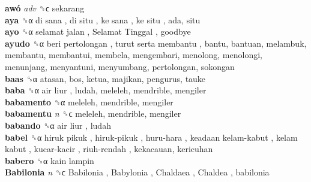 \textbf{awó} \emph{adv}  ␝ϲ  sekarang  \\
\textbf{aya} ␝α   di sana ,  di situ ,  ke sana ,  ke situ , ada, situ  \\
\textbf{ayo} ␝α   selamat jalan ,  Selamat Tinggal , goodbye  \\
\textbf{ayudo} ␝α   beri pertolongan ,  turut serta membantu , bantu, bantuan, melambuk, membantu, membantui, membela, mengembari, menolong, menolongi, menunjang, menyantuni, menyumbang, pertolongan, sokongan  \\
\textbf{baas} ␝α  atasan, bos, ketua, majikan, pengurus, tauke  \\
\textbf{baba} ␝α   air liur , ludah, meleleh, mendrible, mengiler  \\
\textbf{babamento} ␝α  meleleh, mendrible, mengiler  \\
\textbf{babamentu} \emph{n}  ␝ϲ  meleleh, mendrible, mengiler  \\
\textbf{babando} ␝α   air liur , ludah  \\
\textbf{babel} ␝α   hiruk pikuk ,  hiruk-pikuk ,  huru-hara ,  keadaan kelam-kabut ,  kelam kabut ,  kucar-kacir ,  riuh-rendah , kekacauan, kericuhan  \\
\textbf{babero} ␝α   kain lampin   \\
\textbf{Babilonia} \emph{n}  ␝ϲ   Babilonia ,  Babylonia ,  Chaldaea ,  Chaldea , babilonia  \\
